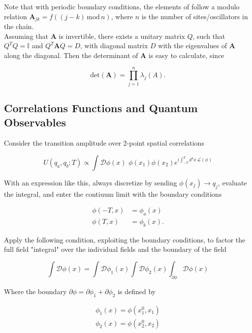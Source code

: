 \noindent Note that with periodic boundary conditions, the elements of follow a modulo relation $\textbf{A}_{jk} = f((j-k) \, \text{mod} \, n)$, where $n$ is the number of sites/oscillators in the chain. \\

\noindent Assuming that $\textbf{A}$ is invertible, there exists a unitary matrix $Q$, such that $Q^T Q = \mathbb{I}$ and $Q^T \textbf{A} Q = D$, with diagonal matrix $D$ with the eigenvalues of $\textbf{A}$ along the diagonal. Then the determinant of $\textbf{A}$ is easy to calculate, since 

\begin{equation}
\text{det}(\textbf{A}) = \prod_{j=1}^n \lambda_j (A).
\end{equation}

\subsection*{Correlations Functions and Quantum Observables}

\noindent Consider the transition amplitude over 2-point spatial correlations

\begin{equation}
U(q_a, q_b; T) \propto \int \mathcal{D} \phi(x) \,\, \phi(x_1) \phi(x_2) e^{i \int_{-T}^T d^4 x \, \mathcal{L}(\phi)}
\end{equation}

\noindent With an expression like this, always discretize by sending $\phi(x_j) \rightarrow q_j$, evaluate the integral, and enter the contiuum limit with the boundary conditions

\begin{align}
\phi (-T, x) &= \phi_a (x) \\
\phi (T, x) &= \phi_b (x).
\end{align}

\noindent Apply the following condition, exploiting the boundary conditions, to factor the full field "integral" over the individual fields and the boundary of the field

\begin{equation}
\int \mathcal{D} \phi (x) = \int \mathcal{D} \phi_1 (x) \int \mathcal{D} \phi_2 (x) \int_{\partial \phi} \mathcal{D} \phi (x)
\end{equation}

\noindent Where the boundary $\partial \phi = \partial \phi_1 + \partial \phi_2$ is defined by 

\begin{align}
\phi_1 (x) = \phi(x_1^0, x_1) \\
\phi_2 (x) = \phi(x_2^0, x_2)
\end{align}

